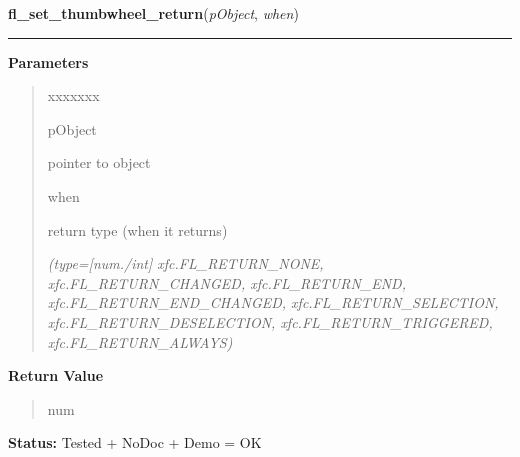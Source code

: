 \hspace{.8\funcindent}\begin{boxedminipage}{\funcwidth}

    \raggedright \textbf{fl\_set\_thumbwheel\_return}(\textit{pObject}, \textit{when})

    \vspace{-1.5ex}

    \rule{\textwidth}{0.5\fboxrule}
\setlength{\parskip}{2ex}
\setlength{\parskip}{1ex}
      \textbf{Parameters}
      \vspace{-1ex}

      \begin{quote}
        \begin{Ventry}{xxxxxxx}

          \item[pObject]

          pointer to object

          \item[when]

          return type (when it returns)

            {\it (type=[num./int] xfc.FL\_RETURN\_NONE, xfc.FL\_RETURN\_CHANGED, 
xfc.FL\_RETURN\_END, xfc.FL\_RETURN\_END\_CHANGED, 
xfc.FL\_RETURN\_SELECTION, xfc.FL\_RETURN\_DESELECTION, 
xfc.FL\_RETURN\_TRIGGERED, xfc.FL\_RETURN\_ALWAYS)}

        \end{Ventry}

      \end{quote}

      \textbf{Return Value}
    \vspace{-1ex}

      \begin{quote}
      num

      \end{quote}

\textbf{Status:} Tested + NoDoc + Demo = OK



    \end{boxedminipage}

    \label{xformslib:library:fl_set_thumbwheel_crossover}

    \vspace{0.5ex}

